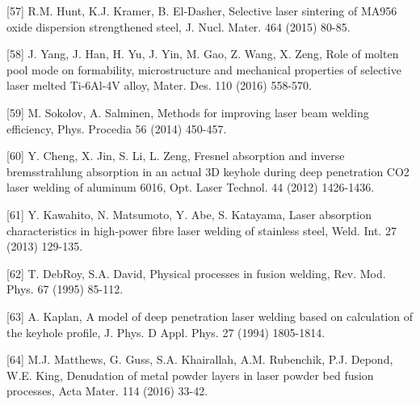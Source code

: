 \documentclass[10pt]{article}
\begin{document}
[57] R.M. Hunt, K.J. Kramer, B. El-Dasher, Selective laser sintering of MA956 oxide dispersion strengthened steel, J. Nucl. Mater. 464 (2015) 80-85.

[58] J. Yang, J. Han, H. Yu, J. Yin, M. Gao, Z. Wang, X. Zeng, Role of molten pool mode on formability, microstructure and mechanical properties of selective laser melted Ti-6Al-4V alloy, Mater. Des. 110 (2016) 558-570.

[59] M. Sokolov, A. Salminen, Methods for improving laser beam welding efficiency, Phys. Procedia 56 (2014) 450-457.

[60] Y. Cheng, X. Jin, S. Li, L. Zeng, Fresnel absorption and inverse bremsstrahlung absorption in an actual 3D keyhole during deep penetration CO2 laser welding of aluminum 6016, Opt. Laser Technol. 44 (2012) 1426-1436.

[61] Y. Kawahito, N. Matsumoto, Y. Abe, S. Katayama, Laser absorption characteristics in high-power fibre laser welding of stainless steel, Weld. Int. 27 (2013) 129-135.

[62] T. DebRoy, S.A. David, Physical processes in fusion welding, Rev. Mod. Phys. 67 (1995) 85-112.

[63] A. Kaplan, A model of deep penetration laser welding based on calculation of the keyhole profile, J. Phys. D Appl. Phys. 27 (1994) 1805-1814.

[64] M.J. Matthews, G. Guss, S.A. Khairallah, A.M. Rubenchik, P.J. Depond, W.E. King, Denudation of metal powder layers in laser powder bed fusion processes, Acta Mater. 114 (2016) 33-42.
\end{document}
